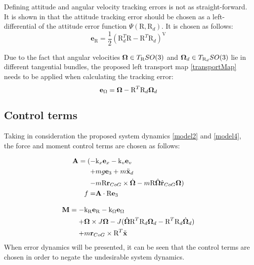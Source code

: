 \noindent Defining attitude and angular velocity tracking errors is not as straight-forward. It is shown in \cite{bulloBook} that the attitude tracking error should be chosen as a left-differential of the attitude error function $\Psi(\text{R}, \text{R}_d)$. It is chosen as follows:
\begin{equation}
	\textbf{e}_\text{R} = \frac{1}{2}(\text{R}_d^T\text{R} - \text{R}^T\text{R}_d)^\text{V}
\end{equation}

\noindent Due to the fact that angular velocities $\boldsymbol{\Omega} \in T_\text{R}SO(3)$ and $\boldsymbol{\Omega}_d \in T_{\text{R}_d}SO(3)$ lie in different tangential bundles, the proposed left transport map \ref{transportMap} needs to be applied when calculating the tracking error:
\begin{equation}
	\textbf{e}_\Omega = \boldsymbol{\Omega} - \text{R}^T\text{R}_d\boldsymbol{\Omega}_d \label{angular_error}
\end{equation}

\subsection{Control terms}

Taking in consideration the proposed system dynamics \ref{model2} and \ref{model4}, the force and moment control terms are chosen as follows:

\begin{align}
	\begin{split}
		\textbf{A} = (-& \text{k}_x \textbf{e}_x - \text{k}_v \textbf{e}_v \\
		+& mg\textbf{e}_3 + m\ddot{\textbf{x}}_d \\
		-& m\text{R}\textbf{r}_{CoG}  \times \dot{\boldsymbol{\Omega}} - m\text{R}\hat{\boldsymbol{\Omega}}\hat{\textbf{r}}_{CoG}\boldsymbol{\Omega} ) \\
		f =& \textbf{A} \cdot \text{R}\textbf{e}_3 \label{force_control}
	\end{split}
\end{align}

\begin{align}
	\begin{split}
		\textbf{M} = -& \text{k}_\text{R} \textbf{e}_\text{R} - \text{k}_\Omega \textbf{e}_\Omega \\
			+& \boldsymbol{\Omega} \times J\boldsymbol{\Omega} - J(\hat{\boldsymbol{\Omega}}\text{R}^T\text{R}_d\boldsymbol{\Omega}_d - \text{R}^T\text{R}_d\dot{\boldsymbol{\Omega}}_d) \\
			+& m\textbf{r}_{CoG} \times \text{R}^T \ddot{\textbf{x}}  \label{moment_control}
	\end{split}
\end{align}
\noindent When error dynamics will be presented, it can be seen that the control terms are chosen in order to negate the undesirable system dynamics.

